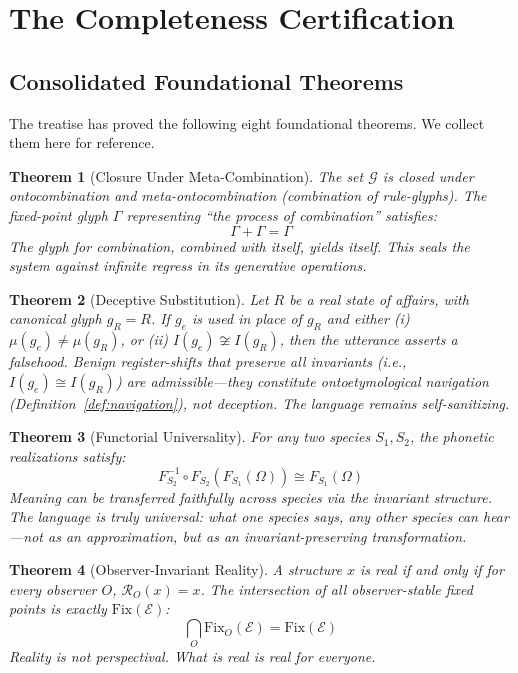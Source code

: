 \documentclass[12pt, letterpaper]{book}
\def\equiv{=}%
\def\oplus{+}%
\def\mathfrak#1{#1}%
\newtheorem{theorem}{Theorem}[chapter]
\begin{document}
\section{The Completeness Certification}

\subsection{Consolidated Foundational Theorems}

The treatise has proved the following eight foundational theorems. We collect them here for reference.

\begin{theorem}[Closure Under Meta-Combination]\label{thm:meta-closure}
The set $\mathcal{G}$ is closed under ontocombination and meta-ontocombination (combination of rule-glyphs). The fixed-point glyph $\Gamma$ representing ``the process of combination'' satisfies:
\[
\Gamma \oplus \Gamma \equiv \Gamma
\]
The glyph for combination, combined with itself, yields itself. This seals the system against infinite regress in its generative operations.
\end{theorem}

\begin{theorem}[Deceptive Substitution]\label{thm:deceptive}
Let $R$ be a real state of affairs, with canonical glyph $\mathfrak{g}_R \equiv R$. If $\mathfrak{g}_e$ is used in place of $\mathfrak{g}_R$ and either (i) $\mu(\mathfrak{g}_e) \neq \mu(\mathfrak{g}_R)$, or (ii) $I(\mathfrak{g}_e) \not\cong I(\mathfrak{g}_R)$, then the utterance asserts a falsehood. Benign register-shifts that preserve all invariants (i.e., $I(\mathfrak{g}_e) \cong I(\mathfrak{g}_R)$) are admissible---they constitute ontoetymological navigation (Definition~\ref{def:navigation}), not deception. The language remains self-sanitizing.
\end{theorem}

\begin{theorem}[Functorial Universality]\label{thm:functorial-univ}
For any two species $S_1, S_2$, the phonetic realizations satisfy:
\[
F_{S_2}^{-1} \circ F_{S_2}(F_{S_1}(\Omega)) \cong F_{S_1}(\Omega)
\]
Meaning can be transferred faithfully across species via the invariant structure. The language is truly universal: what one species says, any other species can hear---not as an approximation, but as an invariant-preserving transformation.
\end{theorem}

\begin{theorem}[Observer-Invariant Reality]\label{thm:observer-invariant}
A structure $x$ is real if and only if for every observer $O$, $\mathcal{R}_O(x) = x$. The intersection of all observer-stable fixed points is exactly $\mathrm{Fix}(\mathcal{E})$:
\[
\bigcap_O \mathrm{Fix}_O(\mathcal{E}) = \mathrm{Fix}(\mathcal{E})
\]
Reality is not perspectival. What is real is real for everyone.
\end{theorem}
\end{document}

